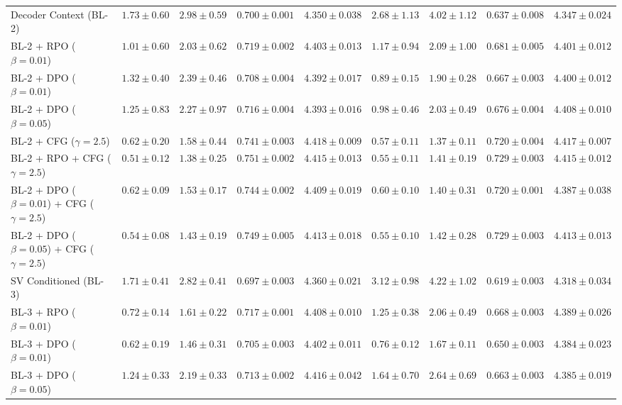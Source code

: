 \begin{table*}[t]
{\begin{tabular}{l|cccc|cccc}
\midrule
Decoder Context (BL-2) & $1.73 \pm 0.60$ & $2.98 \pm 0.59$ & $0.700 \pm 0.001$ & $4.350 \pm 0.038$ & $2.68 \pm 1.13$ & $4.02 \pm 1.12$ & $0.637 \pm 0.008$ & $4.347 \pm 0.024$ \\ 
BL-2 + RPO ($\beta=0.01$) & $1.01 \pm 0.60$ & $2.03 \pm 0.62$ & $0.719 \pm 0.002$ & $4.403 \pm 0.013$ & $1.17 \pm 0.94$ & $2.09 \pm 1.00$ & $0.681 \pm 0.005$ & $4.401 \pm 0.012$ \\ 
BL-2 + DPO ($\beta=0.01$) & $1.32 \pm 0.40$ & $2.39 \pm 0.46$ & $0.708 \pm 0.004$ & $4.392 \pm 0.017$ & $0.89 \pm 0.15$ & $1.90 \pm 0.28$ & $0.667 \pm 0.003$ & $4.400 \pm 0.012$ \\ 
BL-2 + DPO ($\beta=0.05$) & $1.25 \pm 0.83$ & $2.27 \pm 0.97$ & $0.716 \pm 0.004$ & $4.393 \pm 0.016$ & $0.98 \pm 0.46$ & $2.03 \pm 0.49$ & $0.676 \pm 0.004$ & $4.408 \pm 0.010$ \\ 
BL-2 + CFG ($\gamma=2.5$) & $0.62 \pm 0.20$ & $1.58 \pm 0.44$ & $0.741 \pm 0.003$ & $\mathbf{4.418 \pm 0.009}$ & $0.57 \pm 0.11$ & $\mathbf{1.37 \pm 0.11}$ & $0.720 \pm 0.004$ & $\mathbf{4.417 \pm 0.007}$ \\ 
BL-2 + RPO + CFG ($\gamma=2.5$)& $\mathbf{0.51 \pm 0.12}$ & $\mathbf{1.38 \pm 0.25}$ & $\mathbf{0.751 \pm 0.002}$ & $4.415 \pm 0.013$ & $\mathbf{0.55 \pm 0.11}$ & $1.41 \pm 0.19$ & $\mathbf{0.729 \pm 0.003}$ & $4.415 \pm 0.012$ \\ 
BL-2 + DPO ($\beta=0.01$) + CFG ($\gamma=2.5$)& $0.62 \pm 0.09$ & $1.53 \pm 0.17$ & $0.744 \pm 0.002$ & $4.409 \pm 0.019$ & $0.60 \pm 0.10$ & $1.40 \pm 0.31$ & $0.720 \pm 0.001$ & $4.387 \pm 0.038$ \\ 
BL-2 + DPO ($\beta=0.05$) + CFG ($\gamma=2.5$)& $0.54 \pm 0.08$ & $1.43 \pm 0.19$ & $0.749 \pm 0.005$ & $4.413 \pm 0.018$ & $0.55 \pm 0.10$ & $1.42 \pm 0.28$ & $\mathbf{0.729 \pm 0.003}$ & $4.413 \pm 0.013$ \\ 
\midrule
SV Conditioned (BL-3) & $1.71 \pm 0.41$ & $2.82 \pm 0.41$ & $0.697 \pm 0.003$ & $4.360 \pm 0.021$ & $3.12 \pm 0.98$ & $4.22 \pm 1.02$ & $0.619 \pm 0.003$ & $4.318 \pm 0.034$ \\ 
BL-3 + RPO ($\beta=0.01$) & $0.72 \pm 0.14$ & $1.61 \pm 0.22$ & $0.717 \pm 0.001$ & $4.408 \pm 0.010$ & $1.25 \pm 0.38$ & $2.06 \pm 0.49$ & $0.668 \pm 0.003$ & $4.389 \pm 0.026$ \\ 
BL-3 + DPO ($\beta=0.01$) & $0.62 \pm 0.19$ & $1.46 \pm 0.31$ & $0.705 \pm 0.003$ & $4.402 \pm 0.011$ & $0.76 \pm 0.12$ & $1.67 \pm 0.11$ & $0.650 \pm 0.003$ & $4.384 \pm 0.023$ \\ 
BL-3 + DPO ($\beta=0.05$) & $1.24 \pm 0.33$ & $2.19 \pm 0.33$ & $0.713 \pm 0.002$ & $4.416 \pm 0.042$ & $1.64 \pm 0.70$ & $2.64 \pm 0.69$ & $0.663 \pm 0.003$ & $4.385 \pm 0.019$ \\ 

\end{tabular}}
\end{table*}
